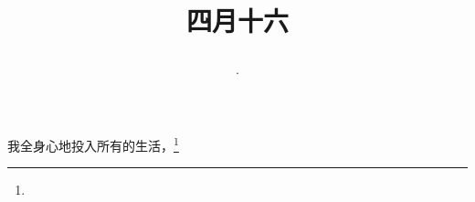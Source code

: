 \title{\date[d=23,m=5,y=2024][year:cn-y,年,month:cn,day:cn,日,·,weekday]·四月十六 }
我全身心地投入所有的生活，\footnote{ }

